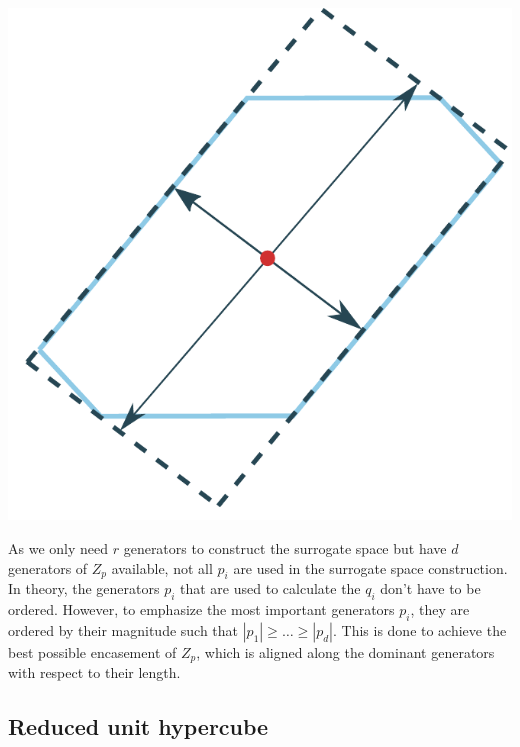 \documentclass[
  a4paper,  %
  twoside,  %
  bibliography=totoc,
  headsepline,
  cleardoublepage=empty,
  parskip=half,
  draft=false
]{scrbook}
\begin{document}
\begin{mdframed}[style=style]
        \centering
\begin{minipage}{.49\textwidth}
        \centering
  \label{fig:surrogate_space}
    \end{minipage}%
    \begin{minipage}{0.49\textwidth}
        \centering
        \vspace{3.5mm}
  \includegraphics[width=0.8\linewidth]{graphics/surrogate_space}
  \hspace{-5.5mm}
    \end{minipage}
\end{mdframed}
%
As we only need $r$ generators to construct the surrogate space but have $d$ generators of $Z_p$ available, not all $p_i$ are used in the surrogate space construction.
In theory, the generators $p_i$ that are used to calculate the $q_i$ don't have to be ordered.
However, to emphasize the most important generators $p_i$, they are ordered by their magnitude such that $|p_1| \geq \dots \geq |p_d|$.
This is done to achieve the best possible encasement of $Z_p$, which is aligned along the dominant generators with respect to their length.

\subsection{Reduced unit hypercube}
\label{sec:ruh}
\end{document}

